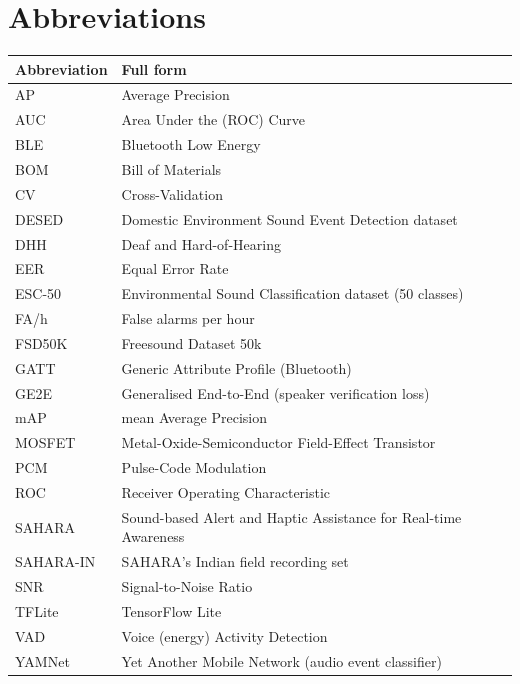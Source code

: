 \documentclass[12pt,a4paper,oneside]{report}
\begin{document}
\tableofcontents
{}
\listoffigures
{}
\listoftables

\chapter*{Abbreviations}
\begin{longtable}{@{}p{3cm}p{10.5cm}@{}}
\toprule
\textbf{Abbreviation} & \textbf{Full form}\\
\midrule
\endhead
AP & Average Precision\\
AUC & Area Under the (ROC) Curve\\
BLE & Bluetooth Low Energy\\
BOM & Bill of Materials\\
CV & Cross-Validation\\
DESED & Domestic Environment Sound Event Detection dataset\\
DHH & Deaf and Hard-of-Hearing\\
EER & Equal Error Rate\\
ESC-50 & Environmental Sound Classification dataset (50 classes)\\
FA/h & False alarms per hour\\
FSD50K & Freesound Dataset 50k\\
GATT & Generic Attribute Profile (Bluetooth)\\
GE2E & Generalised End-to-End (speaker verification loss)\\
mAP & mean Average Precision\\
MOSFET & Metal-Oxide-Semiconductor Field-Effect Transistor\\
PCM & Pulse-Code Modulation\\
ROC & Receiver Operating Characteristic\\
SAHARA & Sound-based Alert and Haptic Assistance for Real-time Awareness\\
SAHARA-IN & SAHARA's Indian field recording set\\
SNR & Signal-to-Noise Ratio\\
TFLite & TensorFlow Lite\\
VAD & Voice (energy) Activity Detection\\
YAMNet & Yet Another Mobile Network (audio event classifier)\\
\bottomrule
\end{longtable}

\clearpage
{}
\end{document}

